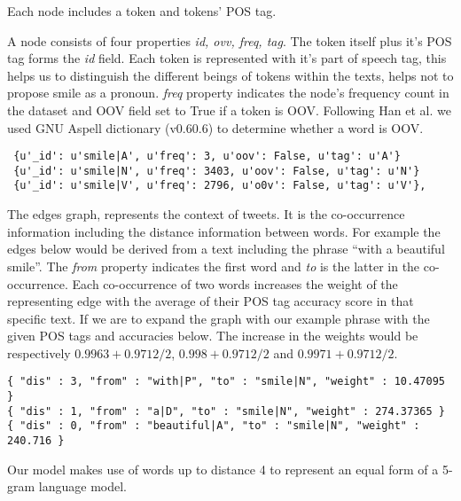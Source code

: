 Each node includes a token and tokens' POS tag.

A node consists of four properties \textit{id, ovv, freq, tag}. The token itself plus it's POS tag forms the \textit{id} field. Each token is represented with it's part of speech tag, this helps us to distinguish the different beings of tokens within the texts, helps not to propose smile as a pronoun. \textit{freq} property indicates the node's frequency count in the dataset and OOV field set to True if a token is OOV. Following Han et al. we used GNU Aspell dictionary (v0.60.6) to determine whether a word is OOV.

\begin{verbatim}
 {u'_id': u'smile|A', u'freq': 3, u'oov': False, u'tag': u'A'}
 {u'_id': u'smile|N', u'freq': 3403, u'oov': False, u'tag': u'N'}
 {u'_id': u'smile|V', u'freq': 2796, u'o0v': False, u'tag': u'V'},
\end{verbatim}

The edges graph, represents the context of tweets. It is the co-occurrence information including the distance information between words. For example the edges below would be derived from a text including the phrase ``with a beautiful smile''. The \textit{from} property indicates the first word and \textit{to} is the latter in the co-occurrence. Each co-occurrence of two words increases the weight of the representing edge with the average of their POS tag accuracy score in that specific text. If we are to expand the graph with our example phrase with the given POS tags and accuracies below. The increase in the weights would be respectively $0.9963+0.9712/2$, $0.998+0.9712/2$ and $0.9971+0.9712/2$.

\begin{verbatim}
{ "dis" : 3, "from" : "with|P", "to" : "smile|N", "weight" : 10.47095 }
{ "dis" : 1, "from" : "a|D", "to" : "smile|N", "weight" : 274.37365 }
{ "dis" : 0, "from" : "beautiful|A", "to" : "smile|N", "weight" : 240.716 }
\end{verbatim}



Our model makes use of words up to distance 4 to represent an equal form of a 5-gram language model.
